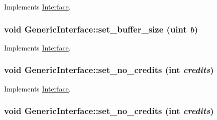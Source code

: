 Implements \hyperlink{classInterface_f2cec7f7aa725d52c8bb02087d7c9e5d}{Interface}.\hypertarget{classGenericInterface_fd1cd1ccd6d355852bee1677cd8b56df}{
\subsubsection[{set\_\-buffer\_\-size}]{\setlength{\rightskip}{0pt plus 5cm}void GenericInterface::set\_\-buffer\_\-size ({\bf uint} {\em b})}}
\label{classGenericInterface_fd1cd1ccd6d355852bee1677cd8b56df}




Implements \hyperlink{classInterface_f2cec7f7aa725d52c8bb02087d7c9e5d}{Interface}.\hypertarget{classGenericInterface_d4d5041bce12cd013a77f476c039c391}{
\subsubsection[{set\_\-no\_\-credits}]{\setlength{\rightskip}{0pt plus 5cm}void GenericInterface::set\_\-no\_\-credits (int {\em credits})}}
\label{classGenericInterface_d4d5041bce12cd013a77f476c039c391}




Implements \hyperlink{classInterface_c458ee6d8e974cb0a9f90308d0feb16d}{Interface}.\hypertarget{classGenericInterface_d4d5041bce12cd013a77f476c039c391}{
\subsubsection[{set\_\-no\_\-credits}]{\setlength{\rightskip}{0pt plus 5cm}void GenericInterface::set\_\-no\_\-credits (int {\em credits})}}
\label{classGenericInterface_d4d5041bce12cd013a77f476c039c391}




